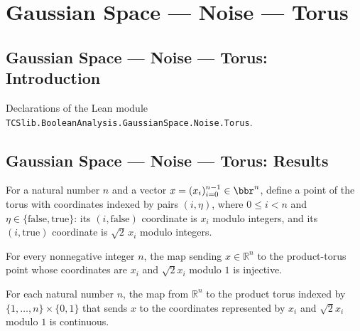 \section{Gaussian Space --- Noise --- Torus}
\subsection*{Gaussian Space --- Noise --- Torus: Introduction}

Declarations of the Lean module \texttt{TCSlib.BooleanAnalysis.GaussianSpace.Noise.Torus}.

\subsection*{Gaussian Space --- Noise --- Torus: Results}

\begin{definition}
\label{BooleanAnalysis.GaussianSpace.gaussianTorusMap}
\leanok
For a natural number $n$ and a vector $x=(x_i)_{i=0}^{n-1}\in\bbr^n$, define a point of
the torus with coordinates indexed by pairs $(i,\eta)$, where $0\le i<n$ and $\eta\in\{\mathrm{false},\mathrm{true}\}$: its $(i,\mathrm{false})$ coordinate is $x_i$
modulo integers, and its $(i,\mathrm{true})$ coordinate is $\sqrt{2}\,x_i$ modulo
integers.
\end{definition}

\begin{lemma}
\label{BooleanAnalysis.GaussianSpace.gaussianTorusMap_injective}
\leanok
{}
For every nonnegative integer $n$, the map sending $x\in\mathbb R^n$ to the
product-torus point whose coordinates are $x_i$ and $\sqrt{2}x_i$ modulo $1$ is
injective.
\end{lemma}

\begin{lemma}
\label{BooleanAnalysis.GaussianSpace.continuous_gaussianTorusMap}
\leanok
{}
For each natural number $n$, the map from $\mathbb R^n$ to the product torus indexed by
$\{1,\ldots,n\}\times\{0,1\}$ that sends $x$ to the coordinates represented by $x_i$ and
$\sqrt{2}x_i$ modulo $1$ is continuous.
\end{lemma}

